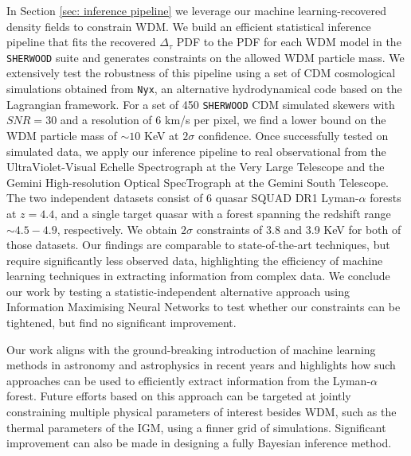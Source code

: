 In Section \ref{sec: inference pipeline} we leverage our machine learning-recovered density fields to constrain WDM. We build an efficient statistical inference pipeline that fits the recovered $\Delta_\tau$ PDF to the PDF for each WDM model in the \texttt{SHERWOOD} suite and generates constraints on the allowed WDM particle mass. We extensively test the robustness of this pipeline using a set of CDM cosmological simulations obtained from \texttt{Nyx}, an alternative hydrodynamical code based on the Lagrangian framework. For a set of 450 \texttt{SHERWOOD} CDM simulated skewers with $SNR=30$ and a resolution of $6$ km/s per pixel, we find a lower bound on the WDM particle mass of $\sim 10$ KeV at $2\sigma$ confidence. Once successfully tested on simulated data, we apply our inference pipeline to real observational from the UltraViolet-Visual Echelle Spectrograph at the Very Large Telescope and the Gemini High-resolution Optical SpecTrograph at the Gemini South Telescope. The two independent datasets consist of 6 quasar SQUAD DR1 Lyman-$\alpha$ forests at $z=4.4$, and a single target quasar with a forest spanning the redshift range $\sim 4.5-4.9$, respectively. We obtain $2\sigma$ constraints of 3.8 and 3.9 KeV for both of those datasets. Our findings are comparable to state-of-the-art techniques, but require significantly less observed data, highlighting the efficiency of machine learning techniques in extracting information from complex data. We conclude our work by testing a statistic-independent alternative approach using Information Maximising Neural Networks to test whether our constraints can be tightened, but find no significant improvement.

Our work aligns with the ground-breaking introduction of machine learning methods in astronomy and astrophysics in recent years and highlights how such approaches can be used to efficiently extract information from the Lyman-$\alpha$ forest. Future efforts based on this approach can be targeted at jointly constraining multiple physical parameters of interest besides WDM, such as the thermal parameters of the IGM, using a finner grid of simulations. Significant improvement can also be made in designing a fully Bayesian inference method.